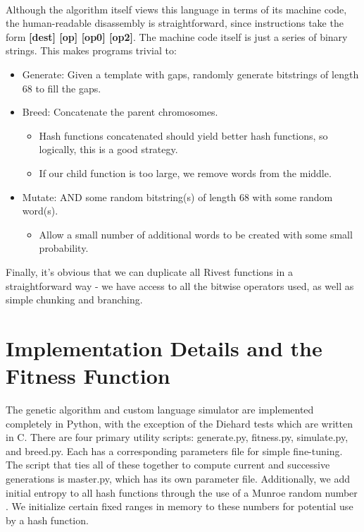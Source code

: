 \documentclass{article}
\begin{document}
\paragraph{}
Although the algorithm itself views this language in terms of its machine code, the human-readable disassembly is straightforward, since instructions take the form \textbf{[dest] [op] [op0] [op2]}. The machine code itself is just a series of binary strings. This makes programs trivial to:
	\begin{itemize}
	\item Generate: Given a template with gaps, randomly generate bitstrings of length 68 to fill the gaps.
	\item Breed: Concatenate the parent chromosomes.
		\begin{itemize}
			\item Hash functions concatenated should yield better hash functions, so logically, this is a good strategy.
			\item If our child function is too large, we remove words from the middle.
		\end{itemize}
	\item Mutate: AND some random bitstring(s) of length 68 with some random word(s).
		\begin{itemize}
		\item Allow a small number of additional words to be created with some small probability.
		\end{itemize}
	\end{itemize}

Finally, it's obvious that we can duplicate all Rivest functions in a straightforward way - we have access to all the bitwise operators used, as well as simple chunking and branching.

\section{Implementation Details and the Fitness Function}
The genetic algorithm and custom language simulator are implemented completely in Python, with the exception of the Diehard tests \cite{Diehard} which are written in C. There are four primary utility scripts: generate.py, fitness.py, simulate.py, and breed.py. Each has a corresponding parameters file for simple fine-tuning. The script that ties all of these together to compute current and successive generations is master.py, which has its own parameter file. Additionally, we add initial entropy to all hash functions through the use of a Munroe random number \cite{Munroe}. We initialize certain fixed ranges in memory to these numbers for potential use by a hash function.
\end{document}
